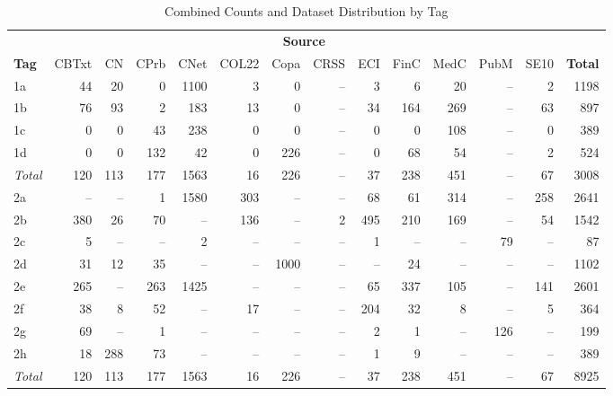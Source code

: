 \documentclass[conference]{IEEEtran}
\begin{document}
\begin{table}[ht]
  \centering
  \small
  \setlength{\tabcolsep}{3pt}
  \caption{Combined Counts and Dataset Distribution by Tag}
  \label{app:tab:dataset_distribution}
  \begin{tabular}{l*{12}{r}r}
    \toprule
    & \multicolumn{12}{c}{\textbf{Source}} & \textbf{} \\
    \cmidrule(lr){2-13} \cmidrule(lr){14-14}
    \textbf{Tag} & CBTxt & CN & CPrb & CNet & COL22 & Copa & CRSS & ECI & FinC & MedC & PubM & SE10 & \textbf{Total} \\
    \midrule
    1a & 44   & 20  & 0   & 1100 & 3    & 0    & -- & 3    & 6    & 20   & --  & 2   & 1198 \\
    1b & 76   & 93  & 2   & 183  & 13   & 0    & -- & 34   & 164  & 269  & --  & 63  & 897  \\
    1c & 0    & 0   & 43  & 238  & 0    & 0    & -- & 0    & 0    & 108  & --  & 0   & 389  \\
    1d & 0    & 0   & 132 & 42   & 0    & 226  & -- & 0    & 68   & 54   & --  & 2   & 524  \\
    \midrule
    \textit{Total} & 120 & 113 & 177 & 1563 & 16 & 226 & -- & 37 & 238 & 451 & -- & 67 & 3008 \\
    \midrule
    \addlinespace
    2a & --   & --  & 1   & 1580 & 303  & --   & -- & 68   & 61   & 314  & --  & 258 & 2641 \\
    2b & 380  & 26  & 70  & --   & 136  & --   & 2  & 495  & 210  & 169  & --  & 54  & 1542 \\
    2c & 5    & --  & --  & 2    & --   & --   & -- & 1    & --   & --   & 79  & --  & 87   \\
    2d & 31   & 12  & 35  & --   & --   & 1000 & -- & --   & 24   & --   & --  & --  & 1102 \\
    2e & 265  & --  & 263 & 1425 & --   & --   & -- & 65   & 337  & 105  & --  & 141 & 2601 \\
    2f & 38   & 8   & 52  & --   & 17   & --   & -- & 204  & 32   & 8    & --  & 5   & 364  \\
    2g & 69   & --  & 1   & --   & --   & --   & -- & 2    & 1    & --   & 126 & --  & 199  \\
    2h & 18   & 288 & 73  & --   & --   & --   & -- & 1    & 9    & --   & --  & --  & 389  \\
    \midrule
    \textit{Total}  & 120  & 113 & 177 & 1563 & 16   & 226  & -- & 37   & 238  & 451  & --  & 67  & 8925 \\
    \bottomrule
  \end{tabular}
\end{table}
\end{document}
